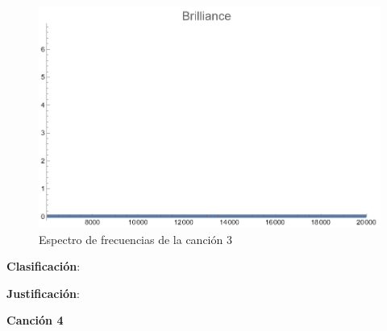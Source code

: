 \documentclass[12pt, letterpaper]{article}
\begin{document}
\begin{figure}[H]
\begin{minipage}{.3\textwidth}
  \end{minipage}
  \begin{minipage}{0.03\textwidth}\end{minipage}
  \begin{minipage}{.3\textwidth}
    \centering
    \includegraphics[width=.9\linewidth]{imgs/Cancion3/brilliance.png}
  \end{minipage}
  \caption{Espectro de frecuencias de la canción 3}
  \label{fig:esp03}
\end{figure}

\textbf{Clasificación}: 

\textbf{Justificación}: 

\newpage

\textbf{\large{Canción 4}}
\end{document}
